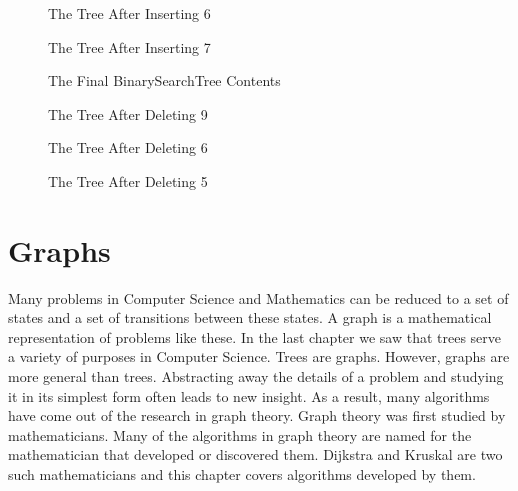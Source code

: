 \documentclass[letterpaper,10pt,english]{sphinxmanual}
\begin{document}
\begin{figure}[htbp]
\centering
\capstart

\noindent{}
\caption{The Tree After Inserting 6}\label{\detokenize{chap6/chap6:id10}}\end{figure}

\begin{figure}[htbp]
\centering
\capstart

\noindent{}
\caption{The Tree After Inserting 7}\label{\detokenize{chap6/chap6:id11}}\end{figure}

\begin{figure}[htbp]
\centering
\capstart

\noindent{}
\caption{The Final BinarySearchTree Contents}\label{\detokenize{chap6/chap6:id12}}\end{figure}

\begin{figure}[htbp]
\centering
\capstart

\noindent{}
\caption{The Tree After Deleting 9}\label{\detokenize{chap6/chap6:id13}}\end{figure}

\begin{figure}[htbp]
\centering
\capstart

\noindent{}
\caption{The Tree After Deleting 6}\label{\detokenize{chap6/chap6:id14}}\end{figure}

\begin{figure}[htbp]
\centering
\capstart

\noindent{}
\caption{The Tree After Deleting 5}\label{\detokenize{chap6/chap6:id15}}\end{figure}


\chapter{Graphs}
\label{\detokenize{chap7/chap7:graphs}}\label{\detokenize{chap7/chap7:graphchap}}\label{\detokenize{chap7/chap7::doc}}
Many problems in Computer Science and Mathematics can be reduced to a set of states and a set of transitions between these states. A graph is a mathematical representation of problems like these. In the last chapter we saw that trees serve a variety of purposes in Computer Science. Trees are graphs. However, graphs are more general than trees. Abstracting away the details of a problem and studying it in its simplest form often leads to new insight. As a result, many algorithms have come out of the research in graph theory. Graph theory was first studied by mathematicians. Many of the algorithms in graph theory are named for the mathematician that developed or discovered them. Dijkstra and Kruskal are two such mathematicians and this chapter covers algorithms developed by them.
\end{document}
